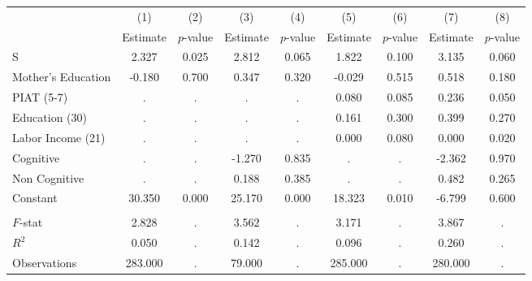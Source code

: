 \begin{tabular}{lcccccccc} \toprule
 & (1) & (2) & (3) & (4) & (5) & (6) & (7) & (8) \\ 
 & Estimate  & $p$-value  & Estimate  & $p$-value  & Estimate  & $p$-value  & Estimate  & $p$-value  \\  \midrule
S &     2.327 &     0.025 &     2.812 &     0.065 &     1.822 &     0.100 &     3.135 &     0.060 \\  
Mother's Education &    -0.180 &     0.700 &     0.347 &     0.320 &    -0.029 &     0.515 &     0.518 &     0.180 \\  
PIAT (5-7) &         . &         . &         . &         . &     0.080 &     0.085 &     0.236 &     0.050 \\  
Education (30) &         . &         . &         . &         . &     0.161 &     0.300 &     0.399 &     0.270 \\  
Labor Income (21) &         . &         . &         . &         . &     0.000 &     0.080 &     0.000 &     0.020 \\  
Cognitive &         . &         . &    -1.270 &     0.835 &         . &         . &    -2.362 &     0.970 \\  
Non Cognitive &         . &         . &     0.188 &     0.385 &         . &         . &     0.482 &     0.265 \\  
Constant &    30.350 &     0.000 &    25.170 &     0.000 &    18.323 &     0.010 &    -6.799 &     0.600 \\ \\ \midrule  
$F$-stat &     2.828 &         . &     3.562 &         . &     3.171 &         . &     3.867 &         . \\  
$R^2$ &     0.050 &         . &     0.142 &         . &     0.096 &         . &     0.260 &         . \\  
Observations &   283.000 &         . &    79.000 &         . &   285.000 &         . &   280.000 &         . \\  
\bottomrule \end{tabular}